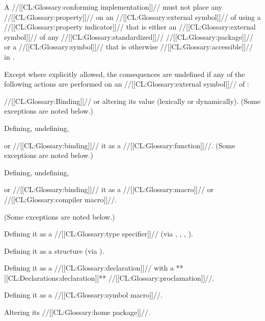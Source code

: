 A //[[CL:Glossary:conforming implementation]]// must not place any //[[CL:Glossary:property]]// on an //[[CL:Glossary:external symbol]]// of  using a //[[CL:Glossary:property indicator]]// that is either an //[[CL:Glossary:external symbol]]// of any //[[CL:Glossary:standardized]]// //[[CL:Glossary:package]]// or a //[[CL:Glossary:symbol]]// that is otherwise //[[CL:Glossary:accessible]]// in .
 

\endsubsubsubsection%
     Except where explicitly allowed, the consequences are undefined if any of the following actions are performed on an //[[CL:Glossary:external symbol]]//  of :

\beginlist

 //[[CL:Glossary:Binding]]// or altering its value (lexically or dynamically). 	      (Some exceptions are noted below.)

 Defining,   	      undefining, 

	  or //[[CL:Glossary:binding]]// it as a //[[CL:Glossary:function]]//. 	      (Some exceptions are noted below.)

 Defining,  	      undefining, 

	   or //[[CL:Glossary:binding]]// it as a //[[CL:Glossary:macro]]//  	      or //[[CL:Glossary:compiler macro]]//.

	      (Some exceptions are noted below.)

 Defining it as a //[[CL:Glossary:type specifier]]//  	      (via ,  		   , 		   , 		   ).

 Defining it as a structure (via ).

 Defining it as a //[[CL:Glossary:declaration]]//  	      with a **[[CL:Declarations:declaration]]** //[[CL:Glossary:proclamation]]//.

 Defining it as a //[[CL:Glossary:symbol macro]]//.

 Altering its //[[CL:Glossary:home package]]//.

